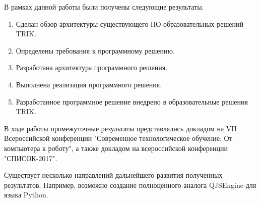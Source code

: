 \documentclass[14pt]{matmex-diploma-custom}
\begin{document}
В рамках данной работы были получены следующие результаты.
\begin{enumerate}
\item Сделан обзор архитектуры существующего ПО образовательных решений TRIK.
\item Определены требования к программному решению.
\item Разработана архитектура программного решения.
\item Выполнена реализация программного решения.
\item Разработанное программное решение внедрено в образовательные решения TRIK.
\end{enumerate}


В ходе работы промежуточные результаты представлялись докладом на VII Всероссийской конференции "Современное технологическое обучение: От компьютера к роботу", а также докладом на всероссийской конференции "СПИСОК-2017".

Существует несколько направлений дальнейшего развития полученных результатов. Например, возможно создание полноценного аналога QJSEngine для языка Python.

\setmonofont[Mapping=tex-text]{CMU Typewriter Text}


\end{document}
